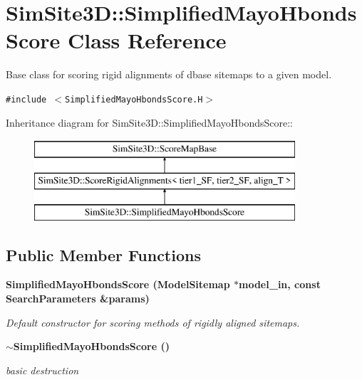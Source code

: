 \section{SimSite3D::Simplified\-Mayo\-Hbonds\-Score Class Reference}
\label{classSimSite3D_1_1SimplifiedMayoHbondsScore}
Base class for scoring rigid alignments of dbase sitemaps to a given model.  


{\tt \#include $<$Simplified\-Mayo\-Hbonds\-Score.H$>$}

Inheritance diagram for SimSite3D::Simplified\-Mayo\-Hbonds\-Score::\begin{figure}[H]
\begin{center}
\leavevmode
\includegraphics[height=3cm]{classSimSite3D_1_1SimplifiedMayoHbondsScore}
\end{center}
\end{figure}
\subsection*{Public Member Functions}
\begin{CompactItemize}
\item 
\bf{Simplified\-Mayo\-Hbonds\-Score} (\bf{Model\-Sitemap} $\ast$model\_\-in, const \bf{Search\-Parameters} \&params)
\begin{CompactList}\small\item\em Default constructor for scoring methods of rigidly aligned sitemaps. \item\end{CompactList}\item 
\bf{$\sim$Simplified\-Mayo\-Hbonds\-Score} ()\label{classSimSite3D_1_1SimplifiedMayoHbondsScore_079bccca92ecadc6a5dfc8752b2a71b2}

\begin{CompactList}\small\item\em basic destruction \item\end{CompactList}\end{CompactItemize}
